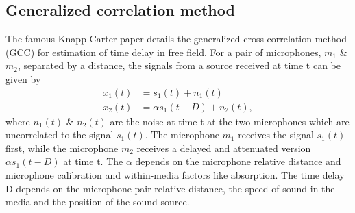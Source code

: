 
\subsection{Generalized correlation method}
The famous Knapp-Carter paper details the generalized cross-correlation method (GCC) for estimation of time delay \cite{1162830} in free field. For a pair of microphones, $m_1$ \& $m_2$, separated by a distance, the signals from a source received at time t can be given by
\begin{equation}
    \begin{split}
        x_1(t) &= s_1(t) + n_1(t) \\
        x_2(t) &= \alpha s_1(t - D) + n_2(t) ,
    \end{split}
\end{equation}
where $n_1(t)$ \& $n_2(t)$ are the noise at time t at the two microphones which are uncorrelated to the signal $s_1(t)$. The microphone $m_1$ receives the signal $s_1(t)$ first, while the microphone $m_2$ receives a delayed and attenuated version $\alpha s_1(t - D)$ at time t. The $\alpha$ depends on the microphone relative distance and microphone calibration and within-media factors like absorption. The time delay D depends on the microphone pair relative distance, the speed of sound in the media and the position of the sound source. 

